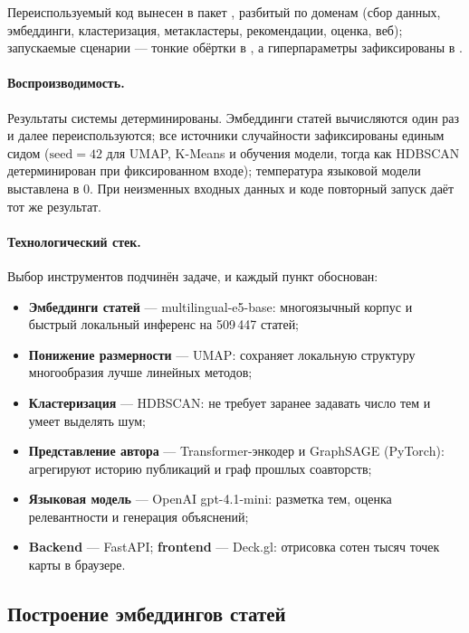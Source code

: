 Переиспользуемый код вынесен в пакет , разбитый по доменам (сбор данных, эмбеддинги,
кластеризация, метакластеры, рекомендации, оценка, веб); запускаемые сценарии — тонкие обёртки в
, а гиперпараметры зафиксированы в .

\paragraph{Воспроизводимость.} Результаты системы детерминированы. Эмбеддинги статей вычисляются
один раз и далее переиспользуются; все источники случайности зафиксированы единым сидом
($\mathrm{seed} = 42$ для UMAP, K-Means и обучения модели, тогда как HDBSCAN детерминирован при
фиксированном входе); температура языковой модели выставлена в $0$. При неизменных входных данных
и коде повторный запуск даёт тот же результат.

\paragraph{Технологический стек.} Выбор инструментов подчинён задаче, и каждый пункт обоснован:

\begin{itemize}
  \item \textbf{Эмбеддинги статей} — multilingual-e5-base: многоязычный корпус и быстрый локальный
        инференс на 509\,447 статей;
  \item \textbf{Понижение размерности} — UMAP: сохраняет локальную структуру многообразия лучше
        линейных методов;
  \item \textbf{Кластеризация} — HDBSCAN: не требует заранее задавать число тем и умеет выделять
        шум;
  \item \textbf{Представление автора} — Transformer-энкодер и GraphSAGE (PyTorch): агрегируют
        историю публикаций и граф прошлых соавторств;
  \item \textbf{Языковая модель} — OpenAI gpt-4.1-mini: разметка тем, оценка релевантности и
        генерация объяснений;
  \item \textbf{Backend} — FastAPI; \textbf{frontend} — Deck.gl: отрисовка сотен тысяч точек
        карты в браузере.
\end{itemize}

\subsection{Построение эмбеддингов статей}
\label{sec:emb}

